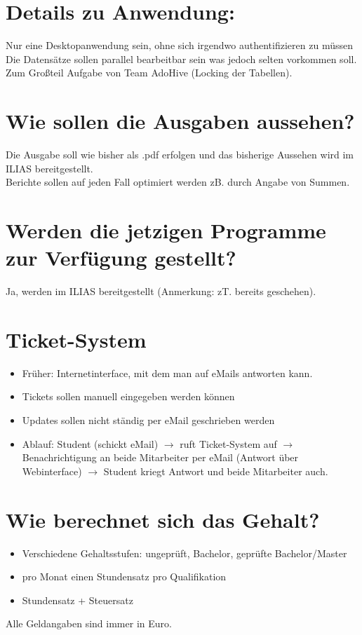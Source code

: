 \documentclass[a4paper]{scrartcl}
\begin{document}
    \section*{Details zu Anwendung:}
        Nur eine Desktopanwendung sein, ohne sich irgendwo authentifizieren zu müssen \\
        Die Datensätze sollen parallel bearbeitbar sein was jedoch selten vorkommen soll. Zum Großteil Aufgabe von Team AdoHive (Locking der Tabellen).

    \section*{Wie sollen die Ausgaben aussehen?}
        Die Ausgabe soll wie bisher als .pdf erfolgen und das bisherige Aussehen wird im ILIAS bereitgestellt. \\
        Berichte sollen auf jeden Fall optimiert werden zB. durch Angabe von
        Summen.

    \section*{Werden die jetzigen Programme zur Verfügung gestellt?}
        Ja, werden im ILIAS bereitgestellt (Anmerkung: zT. bereits geschehen).

    \section*{Ticket-System}
        \begin{itemize}
            \item Früher: Internetinterface, mit dem man auf eMails antworten kann.
            \item Tickets sollen manuell eingegeben werden können
            \item Updates sollen nicht ständig per eMail geschrieben werden
            \item Ablauf: Student (schickt eMail) $\rightarrow$ ruft Ticket-System auf $\rightarrow$ Benachrichtigung an beide Mitarbeiter per eMail (Antwort über Webinterface) $\rightarrow$ Student kriegt Antwort und beide Mitarbeiter auch.
        \end{itemize}
        
    \section*{Wie berechnet sich das Gehalt?}
        \begin{itemize}
            \item Verschiedene Gehaltsstufen: ungeprüft, Bachelor, geprüfte Bachelor/Master
            \item pro Monat einen Stundensatz pro Qualifikation
            \item Stundensatz + Steuersatz
        \end{itemize}
        Alle Geldangaben sind immer in Euro.
        
\end{document}
